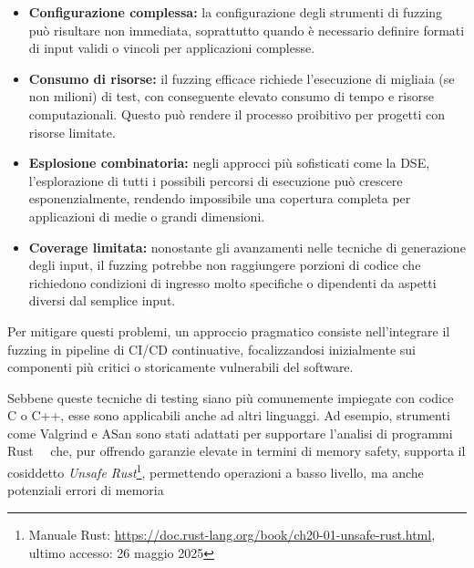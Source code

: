 \begin{itemize}
  \item \textbf{Configurazione complessa:} la configurazione degli strumenti di
    fuzzing può risultare non immediata, soprattutto quando è necessario definire
    formati di input validi o vincoli per applicazioni complesse.

  \item \textbf{Consumo di risorse:} il fuzzing efficace richiede l'esecuzione
    di migliaia (se non milioni) di test, con conseguente elevato consumo di tempo
    e risorse computazionali. Questo può rendere il processo proibitivo per
    progetti con risorse limitate.

  \item \textbf{Esplosione combinatoria:} negli approcci più sofisticati come la
    DSE, l'esplorazione di tutti i possibili percorsi di esecuzione può crescere
    esponenzialmente, rendendo impossibile una copertura completa per
    applicazioni di medie o grandi dimensioni.

  \item \textbf{Coverage limitata:} nonostante gli avanzamenti nelle tecniche di
    generazione degli input, il fuzzing potrebbe non raggiungere porzioni di codice
    che richiedono condizioni di ingresso molto specifiche o dipendenti da aspetti
    diversi dal semplice input.
\end{itemize}

Per mitigare questi problemi, un approccio pragmatico consiste nell'integrare il
fuzzing in pipeline di CI/CD continuative, focalizzandosi inizialmente sui
componenti più critici o storicamente vulnerabili del software.

\bigskip
\noindent
Sebbene queste tecniche di testing siano più comunemente impiegate con codice C
o C++, esse sono applicabili anche ad altri linguaggi. Ad esempio, strumenti come
Valgrind e ASan sono stati adattati per supportare l'analisi di programmi Rust~\cite{valgrind_rust}~\cite{rust_manual_san}
che, pur offrendo garanzie elevate in termini di memory safety, supporta il cosiddetto
\textit{Unsafe Rust}\footnote{Manuale Rust: \url{https://doc.rust-lang.org/book/ch20-01-unsafe-rust.html},
ultimo accesso: 26 maggio 2025}, permettendo operazioni a basso livello, ma anche
potenziali errori di memoria